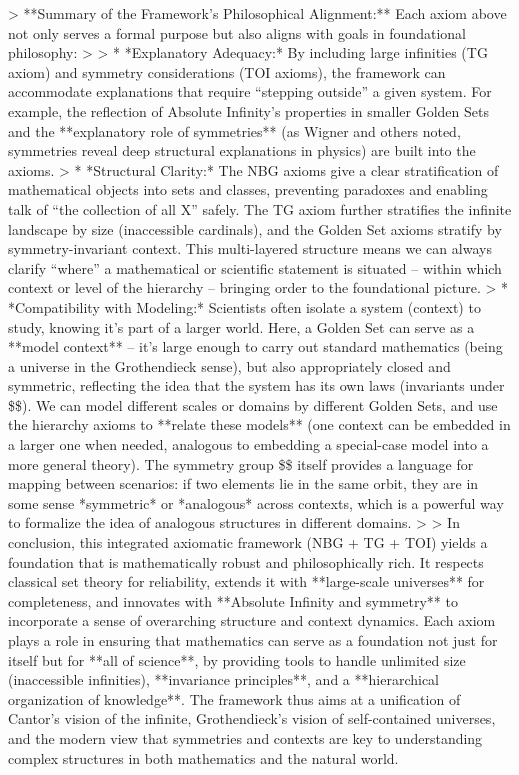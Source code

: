 \documentclass[11pt]{article}
\begin{document}
> **Summary of the Framework’s Philosophical Alignment:** Each axiom above not only serves a formal purpose but also aligns with goals in foundational philosophy:
>
> * *Explanatory Adequacy:* By including large infinities (TG axiom) and symmetry considerations (TOI axioms), the framework can accommodate explanations that require “stepping outside” a given system. For example, the reflection of Absolute Infinity’s properties in smaller Golden Sets and the **explanatory role of symmetries** (as Wigner and others noted, symmetries reveal deep structural explanations in physics) are built into the axioms.
> * *Structural Clarity:* The NBG axioms give a clear stratification of mathematical objects into sets and classes, preventing paradoxes and enabling talk of “the collection of all X” safely. The TG axiom further stratifies the infinite landscape by size (inaccessible cardinals), and the Golden Set axioms stratify by symmetry-invariant context. This multi-layered structure means we can always clarify “where” a mathematical or scientific statement is situated – within which context or level of the hierarchy – bringing order to the foundational picture.
> * *Compatibility with Modeling:* Scientists often isolate a system (context) to study, knowing it’s part of a larger world. Here, a Golden Set can serve as a **model context** – it’s large enough to carry out standard mathematics (being a universe in the Grothendieck sense), but also appropriately closed and symmetric, reflecting the idea that the system has its own laws (invariants under \$\Sym\$). We can model different scales or domains by different Golden Sets, and use the hierarchy axioms to **relate these models** (one context can be embedded in a larger one when needed, analogous to embedding a special-case model into a more general theory). The symmetry group \$\Sym\$ itself provides a language for mapping between scenarios: if two elements lie in the same orbit, they are in some sense *symmetric* or *analogous* across contexts, which is a powerful way to formalize the idea of analogous structures in different domains.
>
> In conclusion, this integrated axiomatic framework (NBG + TG + TOI) yields a foundation that is mathematically robust and philosophically rich. It respects classical set theory for reliability, extends it with **large-scale universes** for completeness, and innovates with **Absolute Infinity and symmetry** to incorporate a sense of overarching structure and context dynamics. Each axiom plays a role in ensuring that mathematics can serve as a foundation not just for itself but for **all of science**, by providing tools to handle unlimited size (inaccessible infinities), **invariance principles**, and a **hierarchical organization of knowledge**. The framework thus aims at a unification of Cantor’s vision of the infinite, Grothendieck’s vision of self-contained universes, and the modern view that symmetries and contexts are key to understanding complex structures in both mathematics and the natural world.
\end{document}
